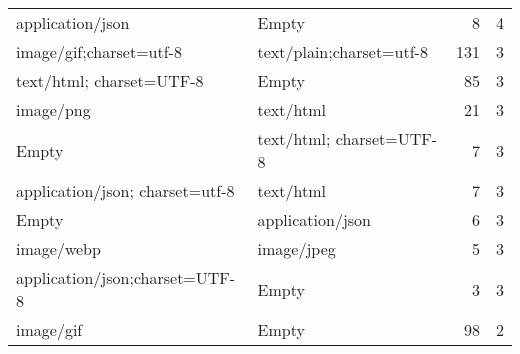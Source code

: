 \begin{tabular}{llrr}
               application/json &                     Empty &     8 &      4 \\
        image/gif;charset=utf-8 &  text/plain;charset=utf-8 &   131 &      3 \\
       text/html; charset=UTF-8 &                     Empty &    85 &      3 \\
                      image/png &                 text/html &    21 &      3 \\
                          Empty &  text/html; charset=UTF-8 &     7 &      3 \\
application/json; charset=utf-8 &                 text/html &     7 &      3 \\
                          Empty &          application/json &     6 &      3 \\
                     image/webp &                image/jpeg &     5 &      3 \\
 application/json;charset=UTF-8 &                     Empty &     3 &      3 \\
                      image/gif &                     Empty &    98 &      2 \\
\bottomrule
\end{tabular}

